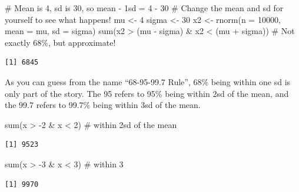 \documentclass[
  letterpaper,
  DIV=11,
  numbers=noendperiod]{scrreprt}
\newenvironment{Shaded}{\begin{snugshade}}{\end{snugshade}}
\newcommand{\AttributeTok}[1]{\textcolor[rgb]{0.40,0.45,0.13}{#1}}
\newcommand{\CommentTok}[1]{\textcolor[rgb]{0.37,0.37,0.37}{#1}}
\newcommand{\DecValTok}[1]{\textcolor[rgb]{0.68,0.00,0.00}{#1}}
\newcommand{\FunctionTok}[1]{\textcolor[rgb]{0.28,0.35,0.67}{#1}}
\newcommand{\NormalTok}[1]{\textcolor[rgb]{0.00,0.23,0.31}{#1}}
\newcommand{\OtherTok}[1]{\textcolor[rgb]{0.00,0.23,0.31}{#1}}
\newcommand{\SpecialCharTok}[1]{\textcolor[rgb]{0.37,0.37,0.37}{#1}}
\begin{document}
\begin{Shaded}
\begin{Highlighting}[]
\CommentTok{\# Mean is 4, sd is 30, so mean {-} 1sd = 4 {-} 30}
\CommentTok{\# Change the mean and sd for yourself to see what happens!}
\NormalTok{mu }\OtherTok{\textless{}{-}} \DecValTok{4}
\NormalTok{sigma }\OtherTok{\textless{}{-}} \DecValTok{30}
\NormalTok{x2 }\OtherTok{\textless{}{-}} \FunctionTok{rnorm}\NormalTok{(}\AttributeTok{n =} \DecValTok{10000}\NormalTok{, }\AttributeTok{mean =}\NormalTok{ mu, }\AttributeTok{sd =}\NormalTok{ sigma)}
\FunctionTok{sum}\NormalTok{(x2 }\SpecialCharTok{\textgreater{}}\NormalTok{ (mu }\SpecialCharTok{{-}}\NormalTok{ sigma) }\SpecialCharTok{\&}\NormalTok{ x2 }\SpecialCharTok{\textless{}}\NormalTok{ (mu }\SpecialCharTok{+}\NormalTok{ sigma)) }\CommentTok{\# Not exactly 68\%, but approximate!}
\end{Highlighting}
\end{Shaded}

\begin{verbatim}
[1] 6845
\end{verbatim}

As you can guess from the name ``68-95-99.7 Rule'', 68\% being within
one sd is only part of the story. The 95 refers to 95\% being within 2sd
of the mean, and the 99.7 refers to 99.7\% being within 3sd of the mean.

\begin{Shaded}
\begin{Highlighting}[]
\FunctionTok{sum}\NormalTok{(x }\SpecialCharTok{\textgreater{}} \SpecialCharTok{{-}}\DecValTok{2} \SpecialCharTok{\&}\NormalTok{ x }\SpecialCharTok{\textless{}} \DecValTok{2}\NormalTok{) }\CommentTok{\# within 2sd of the mean}
\end{Highlighting}
\end{Shaded}

\begin{verbatim}
[1] 9523
\end{verbatim}

\begin{Shaded}
\begin{Highlighting}[]
\FunctionTok{sum}\NormalTok{(x }\SpecialCharTok{\textgreater{}} \SpecialCharTok{{-}}\DecValTok{3} \SpecialCharTok{\&}\NormalTok{ x }\SpecialCharTok{\textless{}} \DecValTok{3}\NormalTok{) }\CommentTok{\# within 3}
\end{Highlighting}
\end{Shaded}

\begin{verbatim}
[1] 9970
\end{verbatim}
\end{document}
